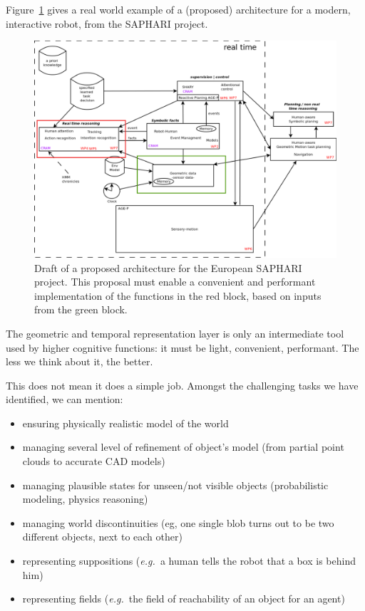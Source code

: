 \documentclass[a4paper]{article}
\newcommand{\eg}{{\textit{e.g.\ }}}
\begin{document}
Figure~\ref{fig|saphari} gives a real world example of a (proposed)
architecture for a modern, interactive robot, from the SAPHARI project.

\begin{figure}[!h]
    \centering
    \includegraphics[width=\columnwidth]{images/saphari-focused.pdf}

    \caption{Draft of a proposed architecture for the European SAPHARI project.
    This proposal must enable a convenient and performant implementation of the
    functions in the red block, based on inputs from the green block.}

    \label{fig|saphari}
\end{figure}


The geometric and temporal representation layer is only an intermediate tool
used by higher cognitive functions: it must be light, convenient, performant.
The less we think about it, the better.

This does not mean it does a simple job. Amongst the challenging tasks we have
identified, we can mention:

\begin{itemize}
    \item ensuring physically realistic model of the world

    \item managing several level of refinement of object's model (from partial
        point clouds to accurate CAD models)

    \item managing plausible states for unseen/not visible objects
        (probabilistic modeling, physics reasoning)

    \item managing world discontinuities (eg, one single blob turns out to be
        two different objects, next to each other)

    \item representing suppositions (\eg a human tells the robot that a box is behind him)

    \item representing fields (\eg the field of reachability of an object for an agent)

\end{itemize}
\end{document}
